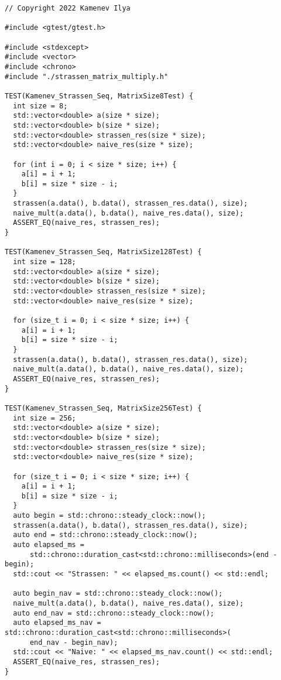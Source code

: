 \documentclass{report}
\begin{document}
\begin{lstlisting}
// Copyright 2022 Kamenev Ilya

#include <gtest/gtest.h>

#include <stdexcept>
#include <vector>
#include <chrono>
#include "./strassen_matrix_multiply.h"

TEST(Kamenev_Strassen_Seq, MatrixSize8Test) {
  int size = 8;
  std::vector<double> a(size * size);
  std::vector<double> b(size * size);
  std::vector<double> strassen_res(size * size);
  std::vector<double> naive_res(size * size);

  for (int i = 0; i < size * size; i++) {
    a[i] = i + 1;
    b[i] = size * size - i;
  }
  strassen(a.data(), b.data(), strassen_res.data(), size);
  naive_mult(a.data(), b.data(), naive_res.data(), size);
  ASSERT_EQ(naive_res, strassen_res);
}

TEST(Kamenev_Strassen_Seq, MatrixSize128Test) {
  int size = 128;
  std::vector<double> a(size * size);
  std::vector<double> b(size * size);
  std::vector<double> strassen_res(size * size);
  std::vector<double> naive_res(size * size);

  for (size_t i = 0; i < size * size; i++) {
    a[i] = i + 1;
    b[i] = size * size - i;
  }
  strassen(a.data(), b.data(), strassen_res.data(), size);
  naive_mult(a.data(), b.data(), naive_res.data(), size);
  ASSERT_EQ(naive_res, strassen_res);
}

TEST(Kamenev_Strassen_Seq, MatrixSize256Test) {
  int size = 256;
  std::vector<double> a(size * size);
  std::vector<double> b(size * size);
  std::vector<double> strassen_res(size * size);
  std::vector<double> naive_res(size * size);

  for (size_t i = 0; i < size * size; i++) {
    a[i] = i + 1;
    b[i] = size * size - i;
  }
  auto begin = std::chrono::steady_clock::now();
  strassen(a.data(), b.data(), strassen_res.data(), size);
  auto end = std::chrono::steady_clock::now();
  auto elapsed_ms =
      std::chrono::duration_cast<std::chrono::milliseconds>(end - begin);
  std::cout << "Strassen: " << elapsed_ms.count() << std::endl;

  auto begin_nav = std::chrono::steady_clock::now();
  naive_mult(a.data(), b.data(), naive_res.data(), size);
  auto end_nav = std::chrono::steady_clock::now();
  auto elapsed_ms_nav = std::chrono::duration_cast<std::chrono::milliseconds>(
      end_nav - begin_nav);
  std::cout << "Naive: " << elapsed_ms_nav.count() << std::endl;
  ASSERT_EQ(naive_res, strassen_res);
}


\end{lstlisting}
\end{document}
